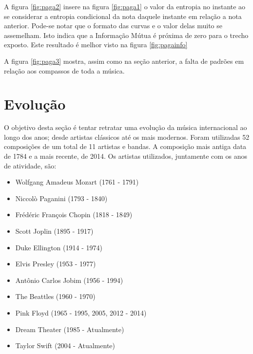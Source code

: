 A figura \ref{fig:paga2} insere na figura \ref{fig:paga1} o valor da entropia no instante ao se considerar a entropia condicional da nota daquele instante em relação a nota anterior. Pode-se notar que o formato das curvas e o valor delas muito se assemelham. Isto indica que a Informação Mútua é próxima de zero para o trecho exposto. Este resultado é melhor visto na figura \ref{fig:pagainfo}

A figura \ref{fig:paga3} mostra, assim como na seção anterior, a falta de padrões em relação aos compassos de toda a música.

\section{Evolução}


O objetivo desta seção é tentar retratar uma evolução da música internacional ao longo dos anos; desde artistas clássicos até os mais modernos. Foram utilizadas 52 composições de um total de 11 artistas e bandas. A composição mais antiga data de 1784 e a mais recente, de 2014. Os artistas utilizados, juntamente com os anos de atividade, são:

\begin{itemize}
    \item Wolfgang Amadeus Mozart (1761 - 1791) \cite{midiworld}
    \item Niccolò Paganini (1793 - 1840) \cite{midimelody}
    \item Frédéric François Chopin (1818 - 1849) \cite{midiworld}
    \item Scott Joplin (1895 - 1917) \cite{trachtman}
    \item Duke Ellington (1914 - 1974) \cite{midimelody}
    \item Elvis Presley (1953 - 1977) \cite{midiworld}
    \item Antônio Carlos Jobim (1956 - 1994) \cite{wersi}
    \item The Beattles (1960 - 1970) \cite{midiworld}
    \item Pink Floyd (1965 - 1995, 2005, 2012 - 2014) \cite{midiworld}
    \item Dream Theater (1985 - Atualmente) \cite{freemidi}
    \item Taylor Swift (2004 - Atualmente) \cite{freemidi}
\end{itemize}

